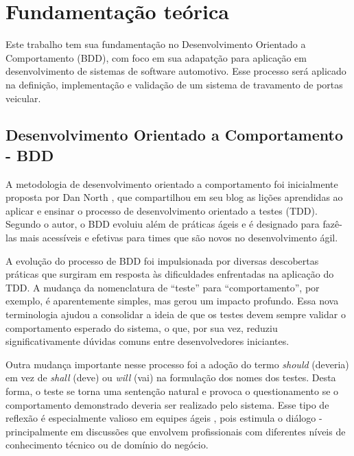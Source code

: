 \chapter{Fundamentação teórica}

Este trabalho tem sua fundamentação no Desenvolvimento Orientado a Comportamento (BDD), com foco em sua adapatção para aplicação em desenvolvimento de sistemas de software automotivo. 
Esse processo será aplicado na definição, implementação e validação de um sistema de travamento de portas veicular.

\section{\textbf{Desenvolvimento Orientado a Comportamento - BDD}}

A metodologia de desenvolvimento orientado a comportamento foi inicialmente proposta por Dan North \cite{north2006bdd}, que compartilhou em seu blog as lições 
aprendidas ao aplicar e ensinar o processo de desenvolvimento orientado a testes (TDD). Segundo o autor, o BDD evoluiu além de práticas ágeis e é designado 
para fazê-las mais acessíveis e efetivas para times que são novos no desenvolvimento ágil.

A evolução do processo de BDD foi impulsionada por diversas descobertas práticas que surgiram em resposta às dificuldades enfrentadas na aplicação do TDD. A mudança 
da nomenclatura de “teste” para “comportamento”, por exemplo, é aparentemente simples, mas gerou um impacto profundo. Essa nova terminologia ajudou a consolidar a 
ideia de que os testes devem sempre validar o comportamento esperado do sistema, o que, por sua vez, reduziu significativamente dúvidas comuns entre desenvolvedores 
iniciantes.

Outra mudança importante nesse processo foi a adoção do termo \textit{should} (deveria) em vez de \textit{shall} (deve) ou \textit{will} (vai) na formulação dos nomes 
dos testes. Desta forma, o teste se torna uma sentenção natural e provoca o questionamento se o comportamento demonstrado deveria ser realizado pelo sistema.  
Esse tipo de reflexão é especialmente valioso em equipes ágeis \cite{atlassianAgileTeams}, pois estimula o diálogo - principalmente em discussões que envolvem 
profissionais com diferentes níveis de conhecimento técnico ou de domínio do negócio.

